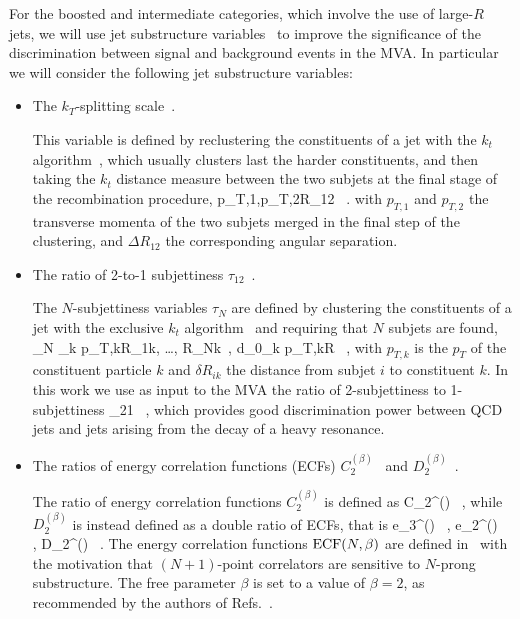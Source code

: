For the   boosted and intermediate categories,
which involve the use of large-$R$ jets,
we will use jet substructure variables~\cite{Salam:2009jx,Aad:2013gja} to
improve the significance of the discrimination between signal and background
events in the MVA.
%
In particular we will consider the following jet
substructure variables:
\begin{itemize}
\item The $k_T$-splitting scale~\cite{Butterworth:2002tt,Butterworth:2008iy}.

  This variable is defined by reclustering the constituents of a jet with the
  $k_t$ algorithm~\cite{Ellis:1993tq},
  which usually clusters last the harder constituents, and then
  taking the $k_t$ distance measure between the two subjets at the final stage of the recombination
  procedure,
  \be
  \label{eq:ktsplitting}
 \lp p_{T,1},p_{T,2}\rp \cdot \Delta R_{12} \, .
\ee
with $p_{T,1}$ and $p_{T,2}$ the transverse momenta of the two subjets merged
in the final step of the clustering, and $\Delta R_{12}$ the corresponding
angular separation.
  
\item The ratio of 2-to-1 subjettiness $\tau_{12}$~\cite{Thaler:2010tr,Thaler:2011gf}.

  The $N$-subjettiness variables $\tau_N$ are defined by clustering the constituents
  of a jet with the exclusive $k_t$ algorithm~\cite{Catani:1993hr}
  and requiring that $N$ subjets are found,
  \be
  \tau_N \equiv {} \sum_k p_{T,k}\lp \delta R_{1k}, \ldots,
  \delta R_{Nk}\rp \, , \qquad d_0\equiv \sum_k p_{T,k}\cdot R \, ,
  \ee
  with $p_{T,k}$ is the $p_T$ of the constituent particle $k$ and $\delta R_{ik}$ the distance from
  subjet $i$ to constituent $k$.
  In this work we use as input to the MVA the ratio of 2-subjettiness to 1-subjettiness
  \be
  \label{eq:tau21}
\tau_{21} \equiv {} \, ,
  \ee
  which provides good discrimination power
  between QCD jets and jets arising from the decay of
  a heavy resonance.
  
\item The ratios of energy correlation functions (ECFs)  $C^{(\beta)}_2$~\cite{Larkoski:2013eya} and
  $D_2^{(\beta)}$~\cite{Larkoski:2014gra}.

  The ratio of energy correlation functions $C_2^{(\beta)}$ is defined as
  \be
  \label{eq:c2}
C_2^{(\beta)} \equiv {} \, ,
\ee
while $D_2^{(\beta)}$ is instead defined as a double ratio of ECFs, that is
\be
e_3^{(\beta)}\equiv {} \, , \quad
  e_2^{(\beta)}\equiv {} \, , \quad
  \label{eq:d2}
D_2^{(\beta)} \equiv {} \, .
\ee
The energy correlation functions ${\rm ECF}(N,\beta)$ are defined
  in~\cite{Larkoski:2013eya} with the motivation that $(N+1)$-point correlators
  are sensitive to $N$-prong substructure.
  The free parameter $\beta$ is set to a value of $\beta=2$,
  as recommended by the authors of Refs.~\cite{Larkoski:2013eya,Larkoski:2014gra}.
\end{itemize}
